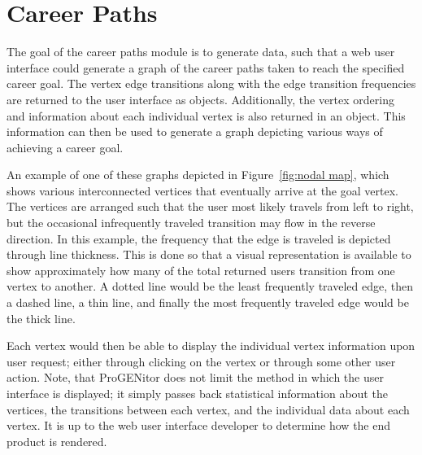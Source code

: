 \section{Career Paths}
\label{sect:career-paths}
The goal of the career paths module is to generate data, such that a web user
interface could generate a graph of the career paths taken to reach the
specified career goal.  The vertex edge transitions along with the edge
transition frequencies are returned to the user interface as objects.  Additionally,
the vertex ordering and information about each individual vertex is also returned in
an object.  This information can then be used to generate a graph
depicting various ways of achieving a career goal.  

An example of one of these graphs depicted in Figure~\ref{fig:nodal map}, which
shows various interconnected vertices that eventually arrive at the goal vertex.  The vertices
are arranged such that the user most likely travels from left to right, but the
occasional infrequently traveled transition may flow in the reverse direction. 
In this example, the frequency that the edge is traveled is depicted through
line thickness.  This is done so that a visual representation is available to
show approximately how many of the total returned users transition from one
vertex to another.  A dotted line would be the least frequently traveled edge,
then a dashed line, a thin line, and finally the most frequently traveled edge
would be the thick line. 

Each vertex would then be able to display the individual vertex information upon
user request; either through clicking on the vertex or through some other user
action.  Note, that ProGENitor does not limit the method in which the user
interface is displayed; it simply passes back statistical information about the
vertices, the transitions between each vertex, and the individual data about
each vertex.  It is up to the web user interface developer to determine how the
end product is rendered.


\usetikzlibrary{shapes,arrows,chains,decorations.markings}

